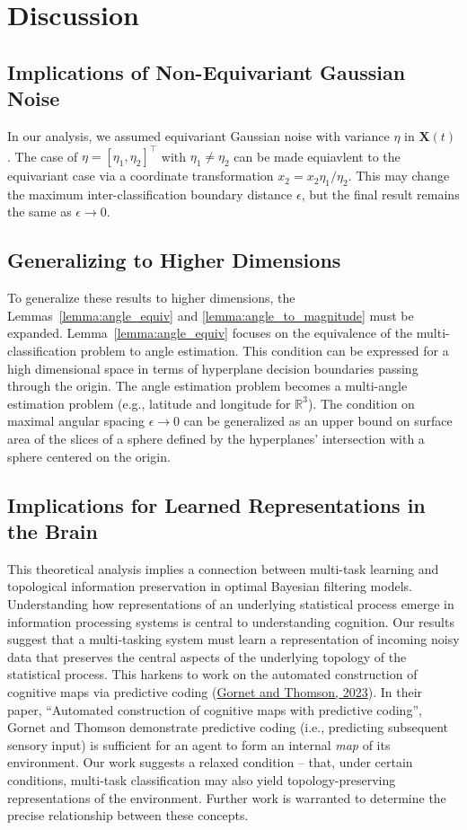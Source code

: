 \documentclass[12pt]{article}
\begin{document}
\section{Discussion}

\subsection{Implications of Non-Equivariant Gaussian Noise}
In our analysis, we assumed equivariant Gaussian noise with variance $\eta$ in
$\mathbf X(t)$. 
The case of $\eta = [\eta_1, \eta_2]^\top$ with $\eta_1\neq\eta_2$ can be made
equiavlent to the equivariant case via a coordinate transformation $x_2 = x_2
\eta_1 / \eta_2$. 
This may change the maximum inter-classification boundary distance $\epsilon$, 
but the final result remains the same as $\epsilon \to 0$. 


\subsection{Generalizing to Higher Dimensions}
To generalize these results to higher dimensions, the Lemmas~\ref{lemma:angle_equiv} and \ref{lemma:angle_to_magnitude} must be expanded. 
Lemma~\ref{lemma:angle_equiv} focuses on the equivalence of the multi-classification problem to angle estimation. 
This condition can be expressed for a high dimensional space in terms of hyperplane decision boundaries passing through the origin. 
The angle estimation problem becomes a multi-angle estimation problem (e.g., latitude and longitude for $\mathbb R^3$). 
The condition on maximal angular spacing $\epsilon \to 0$ can be generalized as an upper bound on surface area of the slices of a sphere defined by the hyperplanes' intersection with a sphere centered on the origin. 

\subsection{Implications for Learned Representations in the Brain}
This theoretical analysis implies a connection between multi-task learning and topological information preservation in optimal Bayesian filtering models. 
Understanding how representations of an underlying statistical process emerge in information processing systems is central to understanding cognition. 
Our results suggest that a multi-tasking system must learn a representation of incoming noisy data that preserves the central aspects of the underlying topology of the statistical process.
This harkens to work on the automated construction of cognitive maps via predictive coding (\href{https://www.biorxiv.org/content/10.1101/2023.09.18.558369v1}{Gornet and Thomson, 2023}). 
In their paper, ``Automated construction of cognitive maps with predictive coding'', Gornet and Thomson demonstrate predictive coding (i.e., predicting subsequent sensory input) is sufficient for an agent to form an internal \textit{map} of its environment. 
Our work suggests a relaxed condition -- that, under certain conditions, multi-task classification may also yield topology-preserving representations of the environment. 
Further work is warranted to determine the precise relationship between these concepts. 
\end{document}
